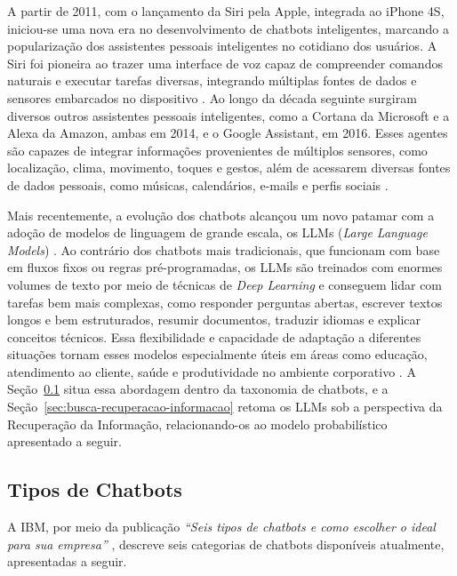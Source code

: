 A partir de 2011, com o lançamento da Siri pela Apple, integrada ao iPhone 4S, iniciou-se uma nova era no desenvolvimento de chatbots inteligentes, marcando a popularização dos assistentes pessoais inteligentes no cotidiano dos usuários. A Siri foi pioneira ao trazer uma interface de voz capaz de compreender comandos naturais e executar tarefas diversas, integrando múltiplas fontes de dados e sensores embarcados no dispositivo \cite{hoy2018}. Ao longo da década seguinte surgiram diversos outros assistentes pessoais inteligentes, como a Cortana da Microsoft e a Alexa da Amazon, ambas em 2014, e o Google Assistant, em 2016. Esses agentes são capazes de integrar informações provenientes de múltiplos sensores, como localização, clima, movimento, toques e gestos, além de acessarem diversas fontes de dados pessoais, como músicas, calendários, e-mails e perfis sociais \cite{shum2018eliza}.

Mais recentemente, a evolução dos chatbots alcançou um novo patamar com a adoção de modelos de linguagem de grande escala, os LLMs (\textit{Large Language Models}) \cite{IBMLLM}. Ao contrário dos chatbots mais tradicionais, que funcionam com base em fluxos fixos ou regras pré-programadas, os LLMs são treinados com enormes volumes de texto por meio de técnicas de \textit{Deep Learning} e conseguem lidar com tarefas bem mais complexas, como responder perguntas abertas, escrever textos longos e bem estruturados, resumir documentos, traduzir idiomas e explicar conceitos técnicos. Essa flexibilidade e capacidade de adaptação a diferentes situações tornam esses modelos especialmente úteis em áreas como educação, atendimento ao cliente, saúde e produtividade no ambiente corporativo \cite{bommasani2021opportunities}. A Seção~\ref{sec:tipos-chatbots} situa essa abordagem dentro da taxonomia de chatbots, e a Seção~\ref{sec:busca-recuperacao-informacao} retoma os LLMs sob a perspectiva da Recuperação da Informação, relacionando-os ao modelo probabilístico apresentado a seguir.

\subsection{Tipos de Chatbots}\label{sec:tipos-chatbots}

A IBM, por meio da publicação \textit{``Seis tipos de chatbots e como escolher o ideal para sua empresa''} \cite{IBMChatbots}, descreve seis categorias de chatbots disponíveis atualmente, apresentadas a seguir.


